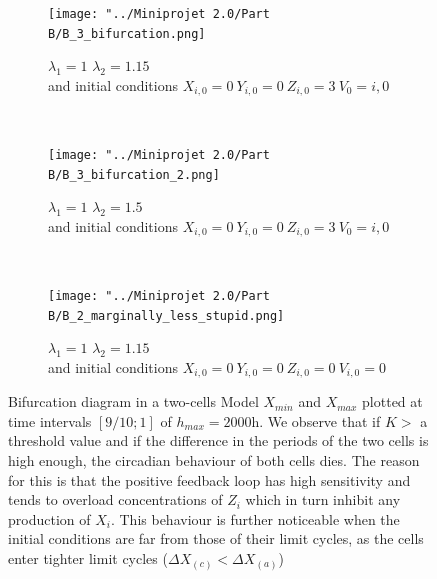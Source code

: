 \documentclass[10pt,a4paper,oneside,twocolumn]{article}
\numberwithin{equation}{section} %
\begin{document}
    \begin{figure}
    \centering
	\begin{subfigure}[b]{0.3\textwidth}
	    \texttt{[image: "../Miniprojet 2.0/Part B/B\_3\_bifurcation.png]}
	    \caption{$\lambda_1=1$ $\lambda_2=1.15$ \\
	    and initial conditions $X_{i,0}=0~Y_{i,0}=0~Z_{i,0}=3~V_0={i,0}$}
	\end{subfigure}
	~
	\begin{subfigure}[b]{0.3\textwidth}
	    \texttt{[image: "../Miniprojet 2.0/Part B/B\_3\_bifurcation\_2.png]}
	    \caption{$\lambda_1=1$ $\lambda_2=1.5$ \\
	    and initial conditions $X_{i,0}=0~Y_{i,0}=0~Z_{i,0}=3~V_0={i,0}$}
	\end{subfigure}
	~ 
	\begin{subfigure}[b]{0.3\textwidth}
	    \texttt{[image: "../Miniprojet 2.0/Part B/B\_2\_marginally\_less\_stupid.png]}
	    \caption{$\lambda_1=1$ $\lambda_2=1.15$ \\
	    and initial conditions $X_{i,0}=0~Y_{i,0}=0~Z_{i,0}=0~V_{i,0}=0$}
	\end{subfigure}

	\caption{Bifurcation diagram in a two-cells Model $X_{min}$ and $X_{max}$ plotted at time intervals $[9/10; 1]$ of $h_{max}=2000$h. We observe that if $K>$ a threshold value and if the difference in the periods of the two cells is high enough, the circadian behaviour of both cells dies. The reason for this is that the positive feedback loop has high sensitivity and tends to overload concentrations of $Z_i$ which in turn inhibit any production of $X_i$. This behaviour is further noticeable when the initial conditions are far from those of their limit cycles, as the cells enter tighter limit cycles ($\Delta X_{(c)} < \Delta X_{(a)}$)}
	\end{figure}
\end{document}
